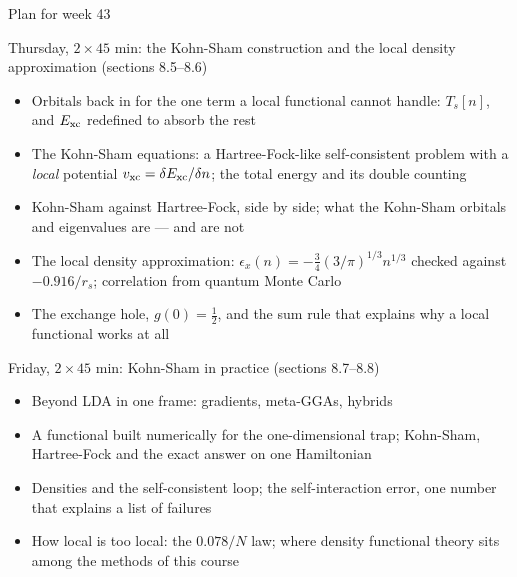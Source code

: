 \documentclass[aspectratio=169,10pt]{beamer}
\begin{document}
\begin{frame}[shrink=5]{Plan for week 43}
  \begin{block}{Thursday, $2\times45$ min: the Kohn-Sham construction and the local density approximation (sections 8.5--8.6)}
    \begin{itemize}
      \item Orbitals back in for the one term a local functional cannot handle: $T_s[n]$, and $E_{\rm xc}$ redefined to absorb the rest
      \item The Kohn-Sham equations: a Hartree-Fock-like self-consistent problem with a \emph{local} potential $v_{\rm xc}=\delta E_{\rm xc}/\delta n$; the total energy and its double counting
      \item Kohn-Sham against Hartree-Fock, side by side; what the Kohn-Sham orbitals and eigenvalues are --- and are not
      \item The local density approximation: $\epsilon_x(n)=-\tfrac34(3/\pi)^{1/3}n^{1/3}$ checked against $-0.916/r_s$; correlation from quantum Monte Carlo
      \item The exchange hole, $g(0)=\tfrac12$, and the sum rule that explains why a local functional works at all
    \end{itemize}
  \end{block}
  \begin{block}{Friday, $2\times45$ min: Kohn-Sham in practice (sections 8.7--8.8)}
    \begin{itemize}
      \item Beyond LDA in one frame: gradients, meta-GGAs, hybrids
      \item A functional built numerically for the one-dimensional trap; Kohn-Sham, Hartree-Fock and the exact answer on one Hamiltonian
      \item Densities and the self-consistent loop; the self-interaction error, one number that explains a list of failures
      \item How local is too local: the $0.078/N$ law; where density functional theory sits among the methods of this course
    \end{itemize}
  \end{block}
\end{frame}
\end{document}
